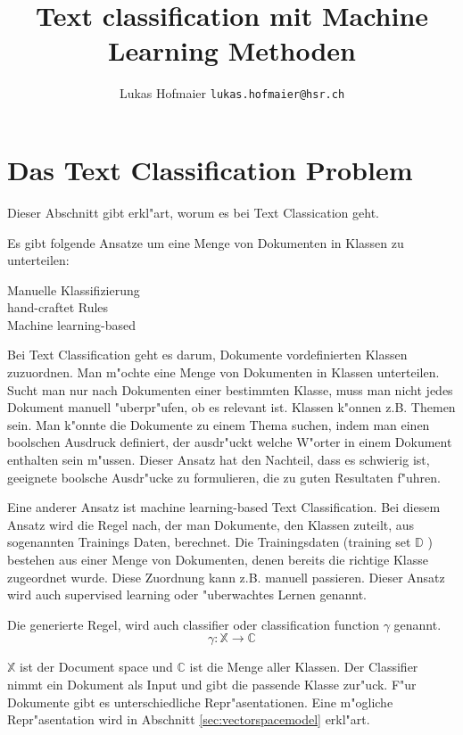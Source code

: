 \documentclass[12pt,a4paper,twoside]{article}
\begin{document}
\lstset{
basicstyle=\small\ttfamily,
xleftmargin=3.5em,
language=Promela,
captionpos=b
}

\title{Text classification mit Machine Learning Methoden}
\author{Lukas Hofmaier \texttt{lukas.hofmaier@hsr.ch}}
\maketitle

\section{Das Text Classification Problem}
\label{sec:problem}

Dieser Abschnitt gibt erkl"art, worum es bei Text Classication geht.

Es gibt folgende Ansatze um eine Menge von Dokumenten in Klassen zu unterteilen:
\begin{description}
\item[Manuelle Klassifizierung]
\item[hand-craftet Rules]
\item[Machine learning-based] 
\end{description}


Bei Text Classification geht es darum, Dokumente vordefinierten Klassen zuzuordnen. Man m"ochte eine Menge von Dokumenten in Klassen unterteilen. Sucht man nur nach Dokumenten einer bestimmten Klasse, muss man nicht jedes Dokument manuell "uberpr"ufen, ob es relevant ist. Klassen k"onnen z.B. Themen sein. Man k"onnte die Dokumente zu einem Thema suchen, indem man einen boolschen Ausdruck definiert, der ausdr"uckt welche W"orter in einem Dokument enthalten sein m"ussen. Dieser Ansatz hat den Nachteil, dass es schwierig ist, geeignete boolsche Ausdr"ucke zu formulieren, die zu guten Resultaten f"uhren.

Eine anderer Ansatz ist machine learning-based Text Classification. Bei diesem Ansatz wird die Regel nach, der man Dokumente, den Klassen zuteilt, aus sogenannten Trainings Daten, berechnet. Die Trainingsdaten (training set $\mathbb{D}$ ) bestehen aus einer Menge von Dokumenten, denen bereits die richtige Klasse zugeordnet wurde. Diese Zuordnung kann z.B. manuell passieren. Dieser Ansatz wird auch supervised learning oder "uberwachtes Lernen genannt. 

Die generierte Regel, wird auch classifier oder classification function $\gamma$ genannt.
\[
\gamma : \mathbb{X} \to \mathbb{C}
\]

$\mathbb{X}$ ist der Document space und $\mathbb{C}$ ist die Menge aller Klassen. Der Classifier nimmt ein Dokument als Input und gibt die passende Klasse zur"uck. F"ur Dokumente gibt es unterschiedliche Repr"asentationen. Eine m"ogliche Repr"asentation wird in Abschnitt \ref{sec:vectorspacemodel} erkl"art.
\end{document}
